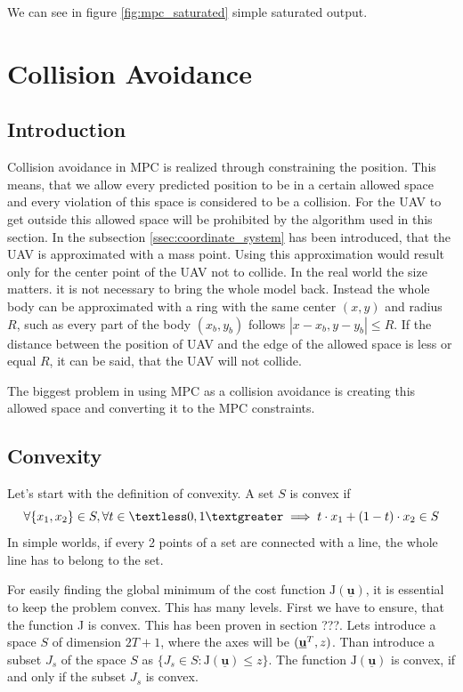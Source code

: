 \documentclass{article}
\begin{document}
We can see in figure \ref{fig:mpc_saturated} simple saturated output. 

\section{Collision Avoidance}
\subsection{Introduction}
Collision avoidance in MPC is realized through constraining the position. This means, that we allow every predicted position to be in a certain allowed space and every violation of this space is considered to be a collision. For the UAV to get outside this allowed space will be prohibited by the algorithm used in this section. In the subsection \ref{ssec:coordinate_system} has been introduced, that the UAV is approximated with a mass point. Using this approximation would result only for the center point of the UAV not to collide. In the real world the size matters. it is not necessary to bring the whole model back. Instead the whole body can be approximated with a ring with the same center $(x, y)$ and radius $R$, such as every part of the body $(x_b, y_b)$ follows $|x - x_b, y - y_b| \leq R$. If the distance between the position of UAV and the edge of the allowed space is less or equal $R$, it can be said, that the UAV will not collide. 

The biggest problem in using MPC as a collision avoidance is creating this allowed space and converting it to the MPC constraints. 

\subsection{Convexity}
\label{sec:convexity}
Let's start with the definition of convexity. A set $S$ is convex if
\begin{equation}
\label{eq:convexity_definition}
\forall\{x_1, x_2\} \in S, \forall t \in  \textless 0, 1 \textgreater \implies t \cdot x_1 + (1-t) \cdot x_2 \in S
\end{equation}
In simple worlds, if every 2 points of a set are connected with a line, the whole line has to belong to the set.

For easily finding the global minimum of the cost function $\mathrm{J}(\underline{\textbf{u}})$, it is essential to keep the problem convex. This has many levels. First we have to ensure, that the function J is convex. This has been proven in section ???. Lets introduce a space $S$ of dimension $2T+1$, where the axes will be $(\textbf{\underline{u}}^T, z)$. Than introduce a subset $J_s$ of the space $S$ as $\{J_s \in S : \mathrm{J}(\underline{\textbf{u}}) \leq z\}$. The function $\mathrm{J}(\underline{\textbf{u}})$ is convex, if and only if the subset $J_s$ is convex. 
\end{document}
